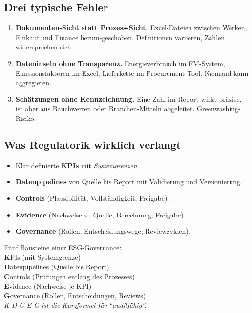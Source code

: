 \documentclass[11pt,a4paper,oneside]{article}
\newcommand{\caveatfontfallback}{\itshape}
\newcommand\caveatfont{\caveatfontfallback}%
\newcommand{\akzent}[1]{{\caveatfont\color{lpAmber}#1}}
\newcommand{\fachbegriff}[1]{\textbf{#1}}
\begin{document}
\subsection{Drei typische Fehler}

\begin{enumerate}
  \item \fachbegriff{Dokumenten-Sicht statt Prozess-Sicht.} Excel-Dateien zwischen Werken, Einkauf und Finance herum-geschoben. Definitionen variieren, Zahlen widersprechen sich.
  \item \fachbegriff{Dateninseln ohne Transparenz.} Energieverbrauch im FM-System, Emissionsfaktoren im Excel, Lieferkette im Procurement-Tool. Niemand kann aggregieren.
  \item \fachbegriff{Schätzungen ohne Kennzeichnung.} Eine Zahl im Report wirkt präzise, ist aber aus Bauchwerten oder Branchen-Mitteln abgeleitet. Greenwashing-Risiko.
\end{enumerate}

\subsection{Was Regulatorik wirklich verlangt}

\begin{itemize}
  \item Klar definierte \fachbegriff{KPIs} mit \emph{Systemgrenzen}.
  \item \fachbegriff{Datenpipelines} von Quelle bis Report mit Validierung und Versionierung.
  \item \fachbegriff{Controls} (Plausibilität, Vollständigkeit, Freigabe).
  \item \fachbegriff{Evidence} (Nachweise zu Quelle, Berechnung, Freigabe).
  \item \fachbegriff{Governance} (Rollen, Entscheidungswege, Reviewzyklen).
\end{itemize}

\begin{eselsbox}[Eselsbrücke: \akzent{K-D-C-E-G}]
Fünf Bausteine einer ESG-Governance:\\[2pt]
\textbf{K}PIs (mit Systemgrenze)\\
\textbf{D}atenpipelines (Quelle bis Report)\\
\textbf{C}ontrols (Prüfungen entlang des Prozesses)\\
\textbf{E}vidence (Nachweise je KPI)\\
\textbf{G}overnance (Rollen, Entscheidungen, Reviews)\\[2pt]
\emph{K-D-C-E-G ist die Kurzformel für ``auditfähig''.}
\end{eselsbox}
\end{document}
